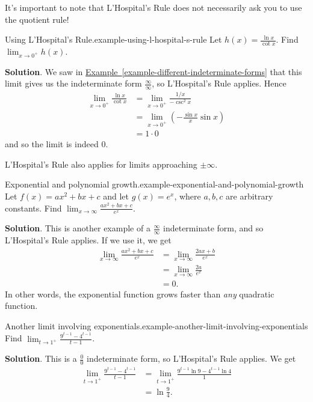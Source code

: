 \documentclass[10pt,]{book}
\numberwithin{equation}{section}
\begin{document}
\hypertarget{p-288}{}%
It's important to note that L'Hospital's Rule does not necessarily ask you to use the quotient rule!%
\begin{example}{Using L'Hospital's Rule.}{example-using-l-hospital-s-rule}%
\hypertarget{p-289}{}%
Let \(h(x) = \frac{\ln x}{\cot x}\). Find \(\lim_{x\to0^{+}}h(x)\).%
\par\smallskip%
\noindent\textbf{Solution}.\hypertarget{solution-63}{}\quad%
\hypertarget{p-290}{}%
We saw in \hyperref[example-different-indeterminate-forms]{Example~\ref{example-different-indeterminate-forms}} that this limit gives us the indeterminate form \(\frac{\infty}{\infty}\), so L'Hospital's Rule applies. Hence%
\begin{align*}
\lim_{x\to0^{+}}\frac{\ln x}{\cot x} & = \lim_{x\to0^{+}}\frac{1/x}{-\csc^{2}x} \\
& = \lim_{x\to0^{+}}\left(-\frac{\sin x}{x}\sin x\right) \\
& = 1\cdot0 
\end{align*}
and so the limit is indeed \(0\).%
\end{example}
\hypertarget{p-291}{}%
L'Hospital's Rule also applies for limits approaching \(\pm\infty\).%
\begin{example}{Exponential and polynomial growth.}{example-exponential-and-polynomial-growth}%
\hypertarget{p-292}{}%
Let \(f(x) = ax^{2} + bx + c\) and let \(g(x) = e^{x}\), where \(a,b,c\) are arbitrary constants. Find \(\lim_{x\to\infty}\frac{ax^{2} + bx + c}{e^{x}}\).%
\par\smallskip%
\noindent\textbf{Solution}.\hypertarget{solution-64}{}\quad%
\hypertarget{p-293}{}%
This is another example of a \(\frac{\infty}{\infty}\) indeterminate form, and so L'Hospital's Rule applies. If we use it, we get%
\begin{align*}
\lim_{x\to\infty}\frac{ax^{2} + bx + c}{e^{x}} & = \lim_{x\to\infty}\frac{2ax+b}{e^{x}} \\
& = \lim_{x\to\infty}\frac{2a}{e^{x}} \\
& = 0. 
\end{align*}
In other words, the exponential function grows faster than \emph{any} quadratic function.%
\end{example}
\begin{example}{Another limit involving exponentials.}{example-another-limit-involving-exponentials}%
\hypertarget{p-294}{}%
Find \(\lim_{t\to1^{+}}\frac{9^{t-1} - 4^{t-1}}{t-1}\).%
\par\smallskip%
\noindent\textbf{Solution}.\hypertarget{solution-65}{}\quad%
\hypertarget{p-295}{}%
This is a \(\frac{0}{0}\) indeterminate form, so L'Hospital's Rule applies. We get%
\begin{align*}
\lim_{t\to1^{+}}\frac{9^{t-1} - 4^{t-1}}{t-1} & = \lim_{t\to1^{+}}\frac{9^{t-1}\ln9 - 4^{t-1}\ln4}{1} \\
& = \ln\frac{9}{4}. 
\end{align*}
%
\end{example}
\end{document}
